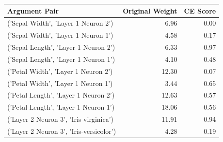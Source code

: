 \begin{tabular}{lrr}
\toprule
Argument Pair & Original Weight & CE Score \\
\midrule
('Sepal Width', 'Layer 1 Neuron 2') & 6.96 & 0.00 \\
('Sepal Width', 'Layer 1 Neuron 1') & 4.58 & 0.17 \\
('Sepal Length', 'Layer 1 Neuron 2') & 6.33 & 0.97 \\
('Sepal Length', 'Layer 1 Neuron 1') & 4.10 & 0.48 \\
('Petal Width', 'Layer 1 Neuron 2') & 12.30 & 0.07 \\
('Petal Width', 'Layer 1 Neuron 1') & 3.44 & 0.65 \\
('Petal Length', 'Layer 1 Neuron 2') & 12.63 & 0.57 \\
('Petal Length', 'Layer 1 Neuron 1') & 18.06 & 0.56 \\
('Layer 2 Neuron 3', 'Iris-virginica') & 11.91 & 0.94 \\
('Layer 2 Neuron 3', 'Iris-versicolor') & 4.28 & 0.19 \\
\bottomrule
\end{tabular}
